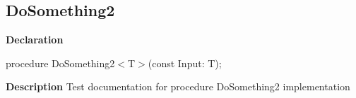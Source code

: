 \documentclass{report}
\newif\ifpdf
\begin{document}
\subsection*{DoSomething2}
\fi
\label{ok_generic_routines-DoSomething2}
\begin{list}{}{
\setlength{\itemindent}{0cm}
\setlength{\listparindent}{0cm}
\setlength{\leftmargin}{\evensidemargin}
\addtolength{\leftmargin}{\tmplength}
\settowidth{\labelsep}{X}
\addtolength{\leftmargin}{\labelsep}
\setlength{\labelwidth}{\tmplength}
}
\item[\textbf{Declaration}\hfill]
\ifpdf
\begin{flushleft}
\fi
\begin{ttfamily}
procedure DoSomething2{$<$}T{$>$}(const Input: T);\end{ttfamily}

\ifpdf
\end{flushleft}
\fi

\par
\item[\textbf{Description}]
Test documentation for procedure DoSomething2 implementation

\end{list}
\end{document}
